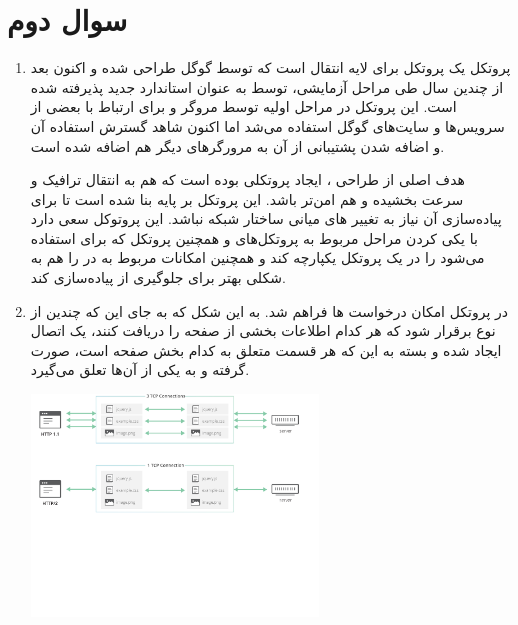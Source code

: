 \documentclass[12pt]{article}
\begin{document}
\section{سوال دوم}

\begin{enumerate}
	\item 
	پروتکل  یک پروتکل برای لایه انتقال است که توسط گوگل طراحی شده و  اکنون بعد از چندین سال طی مراحل آزمایشی، توسط  به عنوان استاندارد جدید پذیرفته شده است. این پروتکل در مراحل اولیه توسط مروگر  و برای ارتباط با بعضی از سرویس‌ها و سایت‌های گوگل استفاده می‌شد اما اکنون شاهد گسترش استفاده آن و اضافه شدن پشتیبانی از آن به مرورگرهای دیگر هم اضافه شده است.
	
	هدف اصلی از طراحی ، ایجاد پروتکلی بوده است که هم به انتقال ترافیک  و  سرعت بخشیده و هم امن‌تر باشد. این پروتکل بر پایه  بنا شده است تا برای پیاده‌سازی آن نیاز به تغییر  های میانی ساختار شبکه نباشد. این پروتوکل سعی دارد با یکی کردن مراحل مربوط به  پروتکل‌های  و همچنین پروتکل  که برای  استفاده می‌شود را در یک پروتکل یکپارچه کند و همچنین امکانات مربوط به  در  را هم به شکلی بهتر برای جلوگیری از  پیاده‌سازی کند.
	
	\item
	
	در پروتکل  امکان  درخواست ها فراهم شد. به این شکل که به جای این که چندین  از نوع  برقرار شود که هر کدام اطلاعات بخشی از صفحه را دریافت کنند، یک اتصال  ایجاد شده و بسته به این که هر قسمت متعلق به کدام بخش صفحه است،  صورت گرفته و به یکی از آن‌ها تعلق می‌گیرد.
	
	\begin{center}
		
		\includegraphics[width = 0.6\textwidth , trim=0 400 0 0]{images/multiplexing.pdf}
	\end{center}
	

\end{enumerate}
\end{document}
